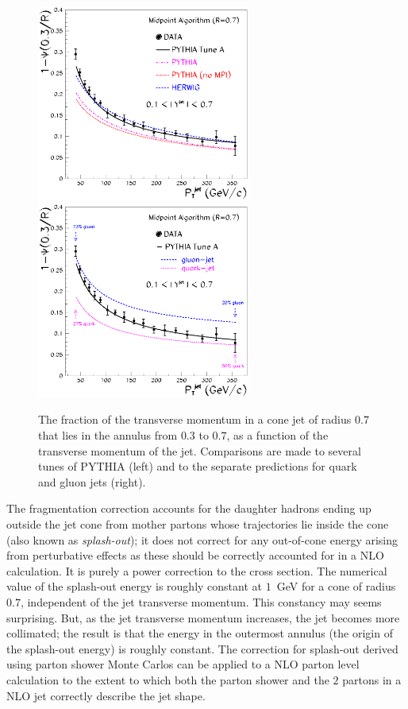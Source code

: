 \documentclass[12pt]{iopart}
\begin{document}
%
\begin{figure}[t]
\begin{center}
\includegraphics[width=7cm]{fig6.eps}
\includegraphics[width=7cm]{fig9.eps}
\end{center}
\caption{The fraction of the transverse momentum in a cone jet of radius $0.7$ that lies in the annulus
from $0.3$ to $0.7$, as a function of the transverse momentum of the jet.
Comparisons are made to several tunes of PYTHIA (left) and to the separate predictions
for quark and gluon jets (right). 
\label{fig:fig6}}
\end{figure}
%



The fragmentation correction accounts for the daughter hadrons ending up outside the jet cone   from mother partons whose trajectories
lie inside the cone (also known as {\it splash-out}); it  does not correct for any out-of-cone energy arising from perturbative effects
as these should  be correctly accounted for in a NLO calculation. It is purely a power correction to the cross  section. The numerical
value of the splash-out energy is roughly constant at $1$~GeV for a cone  of radius $0.7$, independent of the jet transverse momentum.
This constancy may seems surprising.  But, as the jet transverse momentum increases, the jet becomes more collimated; the result is 
that the energy in the outermost annulus (the origin of the splash-out energy) is roughly constant. The correction for splash-out derived
using parton shower Monte Carlos can be applied to a NLO  parton level calculation to the extent to which both the parton shower and
the $2$ partons in a NLO jet correctly describe the jet shape. 
\end{document}
